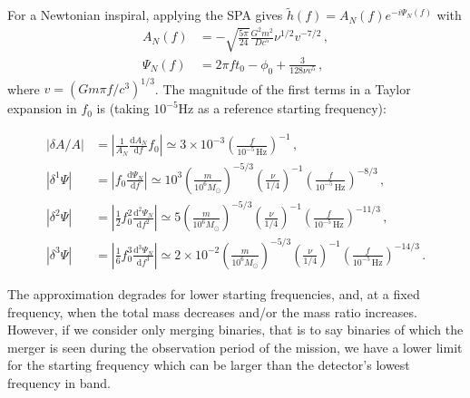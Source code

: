 \documentclass[aps,showpacs,twocolumn,prd,superscriptaddress,nofootinbib]{revtex4}
\newcommand\ud{{\mathrm{d}}}
\newcommand{\Hz}{\,\mathrm{Hz}}
\newcommand{\Msol}{M_{\odot}}
\begin{document}
For a Newtonian inspiral, applying the SPA gives $\tilde{h}(f) = A_{N}(f)e^{-i\Psi_{N}(f)}$ with
%
\begin{subequations}
\begin{align}
	A_{N}(f) &= -\sqrt{\frac{5\pi}{24}} \frac{G^{2}m^{2}}{Dc^{5}} \nu^{1/2}v^{-7/2}\,,\\
	\Psi_{N}(f) &= 2\pi f t_{0} - \phi_{0} + \frac{3}{128\nu v^{5}} \,, 
\end{align}
\end{subequations}
%
where $v=(G m \pi f/c^{3})^{1/3}$. The magnitude of the first terms in a Taylor expansion in $f_{0}$ is (taking $10^{-5}\mathrm{Hz}$ as a reference starting frequency):
%
\begin{widetext}
\begin{subequations}
\begin{align}
	|\delta A/A| &= \left| \frac{1}{A_{N}}\frac{\ud A_{N}}{\ud f} f_0 \right| \simeq 3\times10^{-3} \left(\frac{f}{10^{-5}\Hz}\right)^{-1} \,,\\
	|\delta^{1}\Psi | &= \left| f_0\frac{\ud \Psi_{N}}{\ud f} \right| \simeq 10^{3}\left( \frac{m}{10^{6}\Msol} \right)^{-5/3} \left( \frac{\nu}{1/4} \right)^{-1} \left( \frac{f}{10^{-5}\Hz} \right)^{-8/3} \,, \\
	|\delta^{2}\Psi | &= \left| \frac{1}{2} f_0^{2}\frac{\ud^{2} \Psi_{N}}{\ud f^{2}} \right| \simeq 5 \left( \frac{m}{10^{6}\Msol} \right)^{-5/3} \left( \frac{\nu}{1/4} \right)^{-1} \left( \frac{f}{10^{-5}\Hz} \right)^{-11/3} \,, \\
	|\delta^{3}\Psi | &= \left| \frac{1}{6} f_0^{3}\frac{\ud^{3} \Psi_{N}}{\ud f^{3}} \right| \simeq 2\times 10^{-2} \left( \frac{m}{10^{6}\Msol} \right)^{-5/3} \left( \frac{\nu}{1/4} \right)^{-1} \left( \frac{f}{10^{-5}\Hz} \right)^{-14/3} \,.
\end{align}
\end{subequations}
\end{widetext}
%
The approximation degrades for lower starting frequencies, and, at a fixed frequency, when the total mass decreases and/or the mass ratio increases. However, if we consider only merging binaries, that is to say binaries of which the merger is seen during the observation period of the mission, we have a lower limit for the starting frequency which can be larger than the detector's lowest frequency in band.
\end{document}
